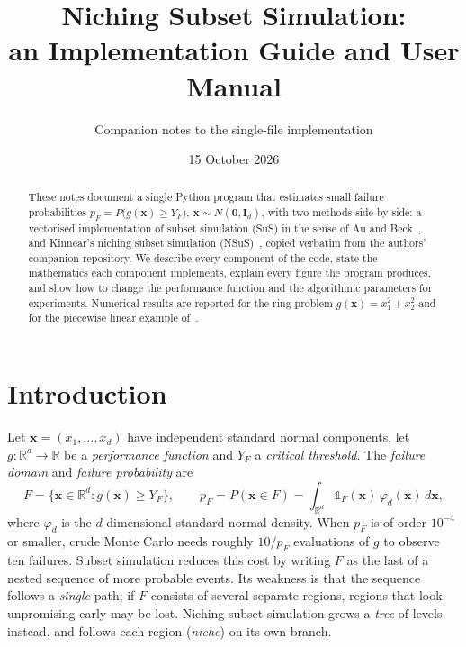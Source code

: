\documentclass[11pt,a4paper]{article}
\title{Niching Subset Simulation:\\ an Implementation Guide and User Manual}
\author{Companion notes to the single-file implementation}
\date{15 October 2026}
\theoremstyle{definition}
\theoremstyle{remark}
\newcommand{\x}{\mathbf{x}}
\newcommand{\R}{\mathbb{R}}
\newcommand{\ind}{\mathbb{1}}
\begin{document}
\maketitle

\begin{abstract}
These notes document a single Python program that estimates small failure probabilities
$p_F = P\big(g(\x) \ge Y_F\big)$, $\x \sim N(\mathbf{0}, \mathbf{I}_d)$, with two methods side by side:
a vectorised implementation of subset simulation (SuS) in the sense of Au and Beck~\cite{aubeck},
and Kinnear's niching subset simulation (NSuS)~\cite{kinnear}, copied verbatim from the authors'
companion repository. We describe every component of the code, state the mathematics each
component implements, explain every figure the program produces, and show how to change the
performance function and the algorithmic parameters for experiments. Numerical results are
reported for the ring problem $g(\x) = x_1^2 + x_2^2$ and for the piecewise linear example of~\cite{kinnear}.
\end{abstract}

\tableofcontents
\newpage

\section{Introduction}

Let $\x = (x_1, \dots, x_d)$ have independent standard normal components, let
$g : \R^d \to \R$ be a \emph{performance function} and $Y_F$ a \emph{critical threshold}. The
\emph{failure domain} and \emph{failure probability} are
\begin{equation}\label{eq:pf}
F = \{\x \in \R^d : g(\x) \ge Y_F\}, \qquad p_F = P(\x \in F) = \int_{\R^d} \ind_F(\x)\, \varphi_d(\x)\, d\x ,
\end{equation}
where $\varphi_d$ is the $d$-dimensional standard normal density. When $p_F$ is of order
$10^{-4}$ or smaller, crude Monte Carlo needs roughly $10/p_F$ evaluations of $g$ to observe
ten failures. Subset simulation reduces this cost by writing $F$ as the last of a nested sequence
of more probable events. Its weakness is that the sequence follows a \emph{single} path; if
$F$ consists of several separate regions, regions that look unpromising early may be lost.
Niching subset simulation grows a \emph{tree} of levels instead, and follows each region
(\emph{niche}) on its own branch.
\end{document}
